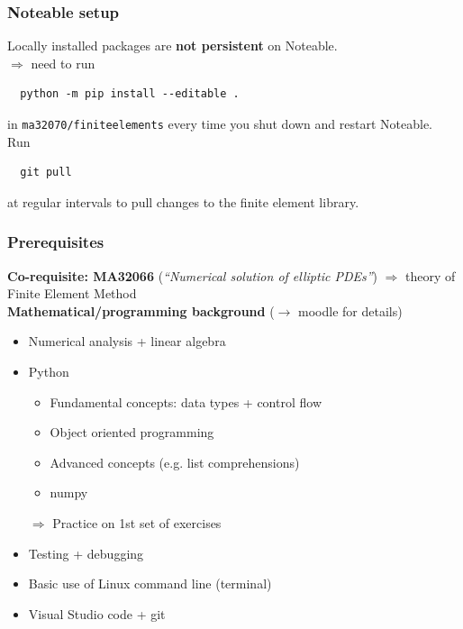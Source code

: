 \documentclass{beamer}
\begin{document}

\begin{frame}[fragile]
\frametitle{Noteable setup}
Locally installed packages are \textbf{not persistent} on Noteable.\\
$\Rightarrow$ need to run
{\color{blue}
\begin{verbatim}
  python -m pip install --editable .
\end{verbatim}}
in \verb!ma32070/finiteelements! every time you shut down and restart Noteable.\\[2ex]
Run 
{\color{blue}
\begin{verbatim}
  git pull
\end{verbatim}}
at regular intervals to pull changes to the finite element library.
\end{frame}


\begin{frame}
\frametitle{Prerequisites}

\textbf{Co-requisite: MA32066} (\textit{``Numerical solution of elliptic PDEs''})
$\Rightarrow$ theory of Finite Element Method\\[2ex]
\textbf{Mathematical/programming background} {\footnotesize($\rightarrow$ moodle for details)}
\begin{itemize}
  \item Numerical analysis + linear algebra
  \item Python
  \begin{itemize}
    \item Fundamental concepts: data types + control flow
    \item Object oriented programming
    \item Advanced concepts (e.g. list comprehensions)
    \item numpy
  \end{itemize}
  \begin{center}
  $\Rightarrow$ Practice on 1st set of exercises
  \end{center}
  \item Testing + debugging
  \item Basic use of Linux command line (terminal)
  \item Visual Studio code + git
\end{itemize}
\end{frame}
\end{document}

